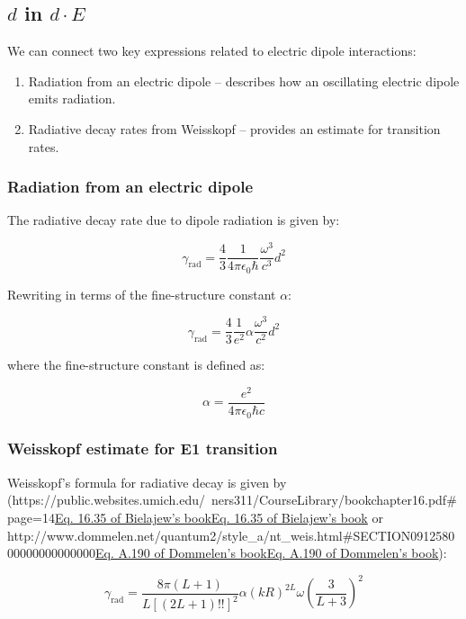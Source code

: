 \documentclass[
]{article}
\let\oldhref\href
\renewcommand{\href}[2]{\ifx#1\urlprefix\oldhref{#1}{#2}\else\uline{\oldhref{#1}{#2}}\fi}
\renewcommand{\[}{\begin{equation}}
\renewcommand{\]}{\end{equation}}
\providecommand{\tightlist}{%
  \setlength{\itemsep}{0pt}\setlength{\parskip}{0pt}}
\begin{document}
\subsection{\texorpdfstring{\(d\) in
\(d \cdot E\)}{d in d \textbackslash cdot E}}\label{d-in-d-cdot-e}

We can connect two key expressions related to electric dipole
interactions:

\begin{enumerate}
\def\labelenumi{\arabic{enumi}.}
\tightlist
\item
  Radiation from an electric dipole -- describes how an oscillating
  electric dipole emits radiation.\\
\item
  Radiative decay rates from Weisskopf -- provides an estimate for
  transition rates.
\end{enumerate}

\subsubsection{Radiation from an electric
dipole}\label{radiation-from-an-electric-dipole}

The radiative decay rate due to dipole radiation is given by:

\[
\gamma_{\text{rad}} = \frac{4}{3} \frac{1}{4 \pi \epsilon_0 \hbar} \frac{\omega^3}{c^3} d^2
\]

Rewriting in terms of the fine-structure constant \(\alpha\):

\[
\gamma_{\text{rad}} = \frac{4}{3} \frac{1}{e^2} \alpha \frac{\omega^3}{c^2} d^2
\]

where the fine-structure constant is defined as:

\[
\alpha = \frac{e^2}{4\pi \epsilon_0 \hbar c}
\]

\subsubsection{Weisskopf estimate for E1
transition}\label{weisskopf-estimate-for-e1-transition}

Weisskopf's formula for radiative decay is given by
(\href{https://public.websites.umich.edu/~ners311/CourseLibrary/bookchapter16.pdf\#page=14}{Eq.
16.35 of Bielajew's book} or
\href{http://www.dommelen.net/quantum2/style_a/nt_weis.html\#SECTION091258000000000000000}{Eq.
A.190 of Dommelen's book}):

\[
\gamma_{\text{rad}} = \frac{8\pi (L+1)}{L \left[(2L+1)!!\right]^2} \alpha (kR)^{2L} \omega \left( \frac{3}{L+3} \right)^2
\]
\end{document}
